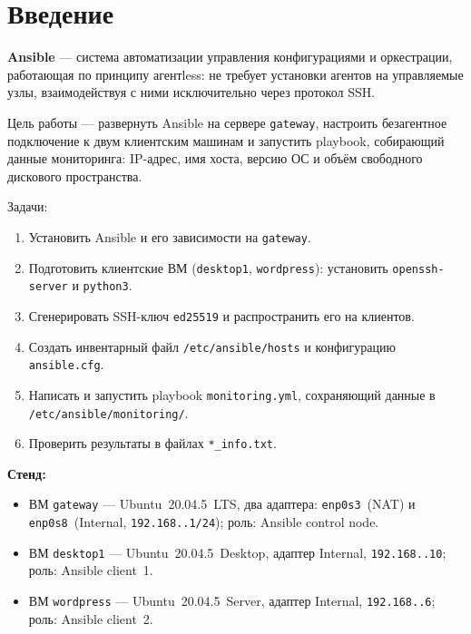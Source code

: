 \chapter*{Введение}
\label{ch:intro}

\textbf{Ansible} — система автоматизации управления конфигурациями и оркестрации,
работающая по принципу агентless: не требует установки агентов на управляемые узлы,
взаимодействуя с ними исключительно через протокол SSH.

Цель работы — развернуть Ansible на сервере \texttt{gateway}, настроить
безагентное подключение к двум клиентским машинам и запустить playbook,
собирающий данные мониторинга: IP-адрес, имя хоста, версию ОС и объём
свободного дискового пространства.

Задачи:
\begin{enumerate}
  \item Установить Ansible и его зависимости на \texttt{gateway}.
  \item Подготовить клиентские ВМ (\texttt{desktop1}, \texttt{wordpress}):
        установить \texttt{openssh-server} и \texttt{python3}.
  \item Сгенерировать SSH-ключ \texttt{ed25519} и распространить его на клиентов.
  \item Создать инвентарный файл \texttt{/etc/ansible/hosts} и конфигурацию
        \texttt{ansible.cfg}.
  \item Написать и запустить playbook \texttt{monitoring.yml},
        сохраняющий данные в \texttt{/etc/ansible/monitoring/}.
  \item Проверить результаты в файлах \texttt{*\_info.txt}.
\end{enumerate}

\textbf{Стенд:}
\begin{itemize}
  \item ВМ \texttt{gateway} — Ubuntu~20.04.5~LTS, два адаптера:
        \texttt{enp0s3}~(NAT) и \texttt{enp0s8}~(Internal,
        \texttt{192.168.\cfgLabStudentN.1/24});
        роль: Ansible control node.
  \item ВМ \texttt{desktop1} — Ubuntu~20.04.5~Desktop, адаптер Internal,
        \texttt{192.168.\cfgLabStudentN.10}; роль: Ansible client~1.
  \item ВМ \texttt{wordpress} — Ubuntu~20.04.5~Server, адаптер Internal,
        \texttt{192.168.\cfgLabStudentN.6}; роль: Ansible client~2.
\end{itemize}

\endinput
